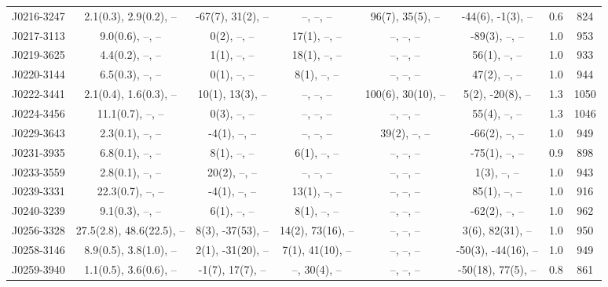 \documentclass{mnras}
\begin{document}
\begin{table*}
\begin{tabular}{cccccccc}
J0216-3247 & 2.1(0.3), 2.9(0.2), -- & -67(7), 31(2), -- & --, --, -- & 96(7), 35(5), -- & -44(6), -1(3), -- & 0.6 & 824 \\ 

J0217-3113 & 9.0(0.6), --, -- & 0(2), --, -- & 17(1), --, -- & --, --, -- & -89(3), --, -- & 1.0 & 953 \\ 

J0219-3625 & 4.4(0.2), --, -- & 1(1), --, -- & 18(1), --, -- & --, --, -- & 56(1), --, -- & 1.0 & 933 \\ 

J0220-3144 & 6.5(0.3), --, -- & 0(1), --, -- & 8(1), --, -- & --, --, -- & 47(2), --, -- & 1.0 & 944 \\ 

J0222-3441 & 2.1(0.4), 1.6(0.3), -- & 10(1), 13(3), -- & --, --, -- & 100(6), 30(10), -- & 5(2), -20(8), -- & 1.3 & 1050 \\ 

J0224-3456 & 11.1(0.7), --, -- & 0(3), --, -- & --, --, -- & --, --, -- & 55(4), --, -- & 1.3 & 1046 \\ 

J0229-3643 & 2.3(0.1), --, -- & -4(1), --, -- & --, --, -- & 39(2), --, -- & -66(2), --, -- & 1.0 & 949 \\ 

J0231-3935 & 6.8(0.1), --, -- & 8(1), --, -- & 6(1), --, -- & --, --, -- & -75(1), --, -- & 0.9 & 898 \\ 

J0233-3559 & 2.8(0.1), --, -- & 20(2), --, -- & --, --, -- & --, --, -- & 1(3), --, -- & 1.0 & 943 \\ 

J0239-3331 & 22.3(0.7), --, -- & -4(1), --, -- & 13(1), --, -- & --, --, -- & 85(1), --, -- & 1.0 & 916 \\ 

J0240-3239 & 9.1(0.3), --, -- & 6(1), --, -- & 8(1), --, -- & --, --, -- & -62(2), --, -- & 1.0 & 962 \\ 

J0256-3328 & 27.5(2.8), 48.6(22.5), -- & 8(3), -37(53), -- & 14(2), 73(16), -- & --, --, -- & 3(6), 82(31), -- & 1.0 & 950 \\ 

J0258-3146 & 8.9(0.5), 3.8(1.0), -- & 2(1), -31(20), -- & 7(1), 41(10), -- & --, --, -- & -50(3), -44(16), -- & 1.0 & 949 \\ 

J0259-3940 & 1.1(0.5), 3.6(0.6), -- & -1(7), 17(7), -- & --, 30(4), -- & --, --, -- & -50(18), 77(5), -- & 0.8 & 861 \\ 


\end{tabular}
\end{table*}
\end{document}

